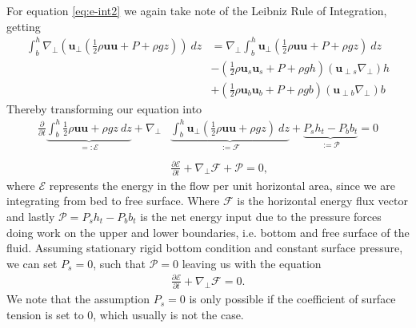 For equation \ref{eq:e-int2} we again take note of the Leibniz Rule of
Integration, getting
\begin{align}
    \int_b^h \nabla_\perp\left( \mathbf{u}_\perp\left(
    \frac{1}{2}\rho\mathbf{u}\mathbf{u}+P+\rho gz \right)  \right)\
    dz
    &= \nabla_\perp \int_b^h \mathbf{u}_\perp\left(
    \frac{1}{2}\rho\mathbf{u}\mathbf{u} + P + \rho g z \right) \ dz\\
    &- \left( \frac{1}{2}\rho \mathbf{u}_s\mathbf{u}_s + P + \rho g h \right)
    \left( \mathbf{u}_{\perp s} \nabla_\perp \right) h\\
    &+\left( \frac{1}{2}\rho \mathbf{u}_b\mathbf{u}_b + P + \rho g b \right)
    \left( \mathbf{u}_{\perp b} \nabla_\perp \right) b
\end{align}
Thereby transforming our equation into
\begin{align}
    \frac{\partial }{\partial t} \underbrace{\int_b^h \frac{1}{2}\rho
    \mathbf{u}\mathbf{u}+\rho g z\ dz}_{=:\mathcal{E}}
    + \nabla_\perp&\underbrace{\int_b^h
    \mathbf{u}_\perp\left( \frac{1}{2}\rho\mathbf{u}\mathbf{u} + \rho g z
\right)\ dz}_{:=\mathcal{F}}
+ \underbrace{P_s h_t - P_b b_t}_{:=\mathcal{P}} = 0\\
\nonumber\\
    &\frac{\partial \mathcal{E}}{\partial t}
    + \nabla_\perp \mathcal{F} + \mathcal{P} = 0,
\end{align}
where $\mathcal{E}$ represents the energy in the flow per unit horizontal
area, since we are integrating from bed to free surface. Where $\mathcal{F}$
is the horizontal energy flux vector and lastly $\mathcal{P} = P_s h_t -
P_b b_t$ is the net energy input due to the pressure forces doing work on the
upper and lower boundaries, i.e. bottom and free surface of the fluid.
Assuming stationary rigid bottom condition and constant surface pressure, we
can set $P_s=0$, such that $\mathcal{P} =0$ leaving us with the equation
\begin{align}
    \frac{\partial \mathcal{E}}{\partial t}
    + \nabla_\perp \mathcal{F} = 0.
\end{align}
We note that the assumption $P_s=0$ is only possible if the coefficient of
surface tension is set to 0, which usually is not the case.
